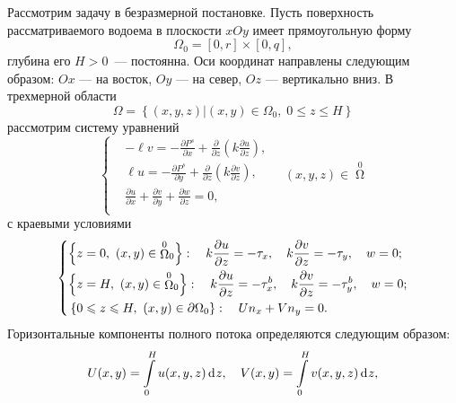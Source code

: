 \documentclass[press]{vestnik}
\begin{document}
Рассмотрим задачу в безразмерной постановке. Пусть поверхность 
рассматриваемого водоема в плоскости $xOy$ имеет прямоугольную форму
\begin{equation}
\label{eq1}
\Omega_{0} =\left[ {0,r} \right]\times \left[ {0,q} \right],
\end{equation}
глубина его $H>0$~--- постоянна. Оси координат направлены следующим образом: $Ox$ 
--- на восток, $Oy$ --- на север, $Oz$ --- вертикально вниз. В трехмерной области 
\begin{equation}
\label{eq2}
\Omega =\left\{ {\left( {x,y,z} \right)\vert \left( {x,y} \right)\in \Omega 
_{0} ,\;0\leqslant  z\leqslant  H} \right\}
\end{equation}
рассмотрим систему уравнений
\begin{equation}
\label{eq3}
\left\{ \begin{aligned}
 &-\ell v=-\frac{\partial P^{s}}{\partial x}+\frac{\partial }{\partial 
z}\left( {k\frac{\partial u}{\partial z}} \right), \\ 
 &\ell u=-\frac{\partial P^{s}}{\partial y}+\frac{\partial }{\partial 
z}\left( {k\frac{\partial v}{\partial z}} \right), \\ 
 &\frac{\partial u}{\partial x}+\frac{\partial v}{\partial y}+\frac{\partial 
w}{\partial z}=0, \\ 
 \end{aligned} \right.\quad\left( {x,y,z} \right)\in \mathop{\Omega}\limits^{0} 
\end{equation}
с краевыми условиями
\begin{equation}
\label{eq4}
\left\{ \begin{aligned}
 &\Bigl\{ z=0,\ \left( x,y \right) \in {\mathop{\Omega}\limits^0}_0 \Bigr\}:\quad k\frac{\partial u}{\partial z}=-\tau_{x},\quad k\frac{\partial v}{\partial z}=-\tau_{y} ,\quad w=0; \\ 
 &\Bigl\{ z=H,\ \left( x,y \right)\in {\mathop{\Omega}\limits^0}_0 \Bigr\}:\quad k\frac{\partial u}{\partial z}=-\tau_{x}^{b} ,\quad k\frac{\partial v}{\partial z}=-\tau_{y}^{b} ,\quad w=0; \\ 
 &\left\{ 0\leqslant z\leqslant H,\ \left( {x,y} \right)\in \partial \Omega_{0}  
\right\}:\quad U n_{x} +V n_{y} =0. 
 \end{aligned} \right.
\end{equation}
Горизонтальные компоненты полного потока определяются следующим образом: 
\begin{equation}
\label{eq5}
U(x,y)=\int\limits_0^H {u(x,y,z)\d z} ,\quad V(x,y)=\int\limits_0^H 
{v(x,y,z)\d z} ,
\end{equation}
\end{document}
